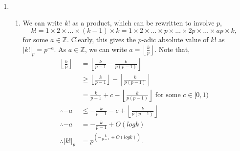 \documentclass[a4paper,11pt]{article}
\newcommand{\ds}{\displaystyle}
\begin{document}
{{\begin{enumerate}[leftmargin=*]
		\item
			\begin{enumerate}
				\item We can write $\ds{k!}$ as a product, which can be rewritten to involve $\ds{p}$, $$k! = 1\times2\times \dots \times(k-1) \times k = 1 \times 2 \times \dots \times p \times \dots \times 2p \times \dots \times ap \times k,$$ for some $\ds{a \in \mathbb{Z}}$. Clearly, this gives the $\ds{p}$-adic absolute value of $\ds{k!}$ as $\ds{|k!|_p = p^{-a}}$. As $\ds{a \in \mathbb{Z}}$, we can write $\ds{a = \left \lfloor{\frac{k}{p}}\right \rfloor}$. Note that,
					\begin{align*}
						\left \lfloor{\frac{k}{p}}\right \rfloor & = \left \lfloor{\frac{k}{p-1} - \frac{k}{p(p-1)}}\right \rfloor\\
																 & \geq \left \lfloor{\frac{k}{p-1}}\right \rfloor - \left \lfloor{\frac{k}{p(p-1)}}\right \rfloor\\
																 & = \frac{k}{p-1} + c - \left \lfloor{\frac{k}{p(p-1)}}\right \rfloor \text{ for some } c \in [0,1)\\
												   \therefore -a & \leq -\frac{k}{p-1} - c + \left \lfloor{\frac{k}{p(p-1)}}\right \rfloor\\
												   \therefore -a & = - \frac{k}{p-1} + O(logk)\\
											   \therefore |k!|_p & = p^{\left(-\frac{k}{p-1} + O(logk)\right)}.
					\end{align*}


\end{enumerate}
\end{enumerate}}}
\end{document}
